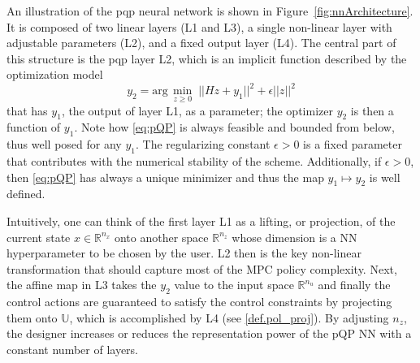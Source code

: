 An illustration of the \ac{pqp} neural network is shown in Figure~\ref{fig:nnArchitecture}. It is composed of two linear layers (L1 and L3), a single non-linear layer with adjustable parameters (L2), and a fixed output layer (L4). The central part of this structure is the \ac{pqp} layer L2, which is an implicit function described by the optimization model
\begin{equation}
	\label{eq:pQP}
	y_2 = \text{arg}\,\min_{z \geq 0} \; ||Hz + y_1||^{2} + \epsilon ||z||^2
\end{equation}
that has $y_1$, the output of layer L1, as a parameter; the optimizer $y_2$ is then a function of $y_1$. Note how \eqref{eq:pQP} is always feasible and bounded from below, thus well posed for any $y_1$. The regularizing constant $\epsilon > 0$ is a fixed parameter that contributes with the numerical stability of the scheme. Additionally, if $\epsilon > 0$, then \eqref{eq:pQP} has always a unique minimizer and thus the map $y_1 \mapsto y_2$ is well defined.

Intuitively, one can think of the first layer L1 as a lifting, or projection, of the current state $x \in \mathbb{R}^{n_x}$ onto another space $\mathbb{R}^{n_z}$ whose dimension is a NN hyperparameter to be chosen by the user. L2 then is the key non-linear transformation that should capture most of the MPC policy complexity. Next, the affine map in L3 takes the $y_2$ value to the input space $\mathbb{R}^{n_u}$ and finally the control actions are guaranteed to satisfy the control constraints by projecting them onto $\mathbb{U}$, which is accomplished by L4 (see \eqref{def.pol_proj}). By adjusting $n_z$, the designer increases or reduces the representation power of the pQP NN with a constant number of layers.

